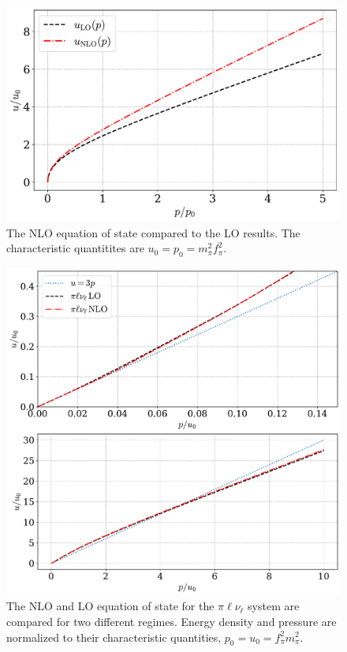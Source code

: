 \begin{figure}
    \centering
    \includegraphics[width=.8\textwidth]{../scripts/figurer/pion_eos_nlo.pdf}
    \caption{The NLO equation of state compared to the LO results. The characteristic quantitites are $u_0 = p_0 = m_\pi^2 f_\pi^2$.}
    \label{fig: nlo eos}
\end{figure}

\begin{figure}[!htb]
    \centering
    \includegraphics[width=.82\textwidth]{../scripts/figurer/pion_star/neutrino_nlo_eos.pdf}
    \caption{The NLO and LO equation of state for the $\pi \ell \nu_\ell$ system are compared for two different regimes. Energy density and pressure are normalized to their characteristic quantities, $p_0 = u_0 = f_\pi^2m_\pi^2$.}
    \label{fig: eos pi ell nu}
\end{figure}



